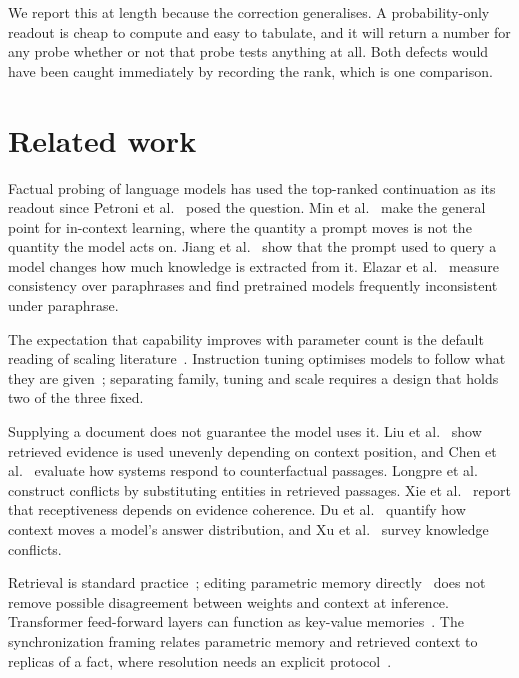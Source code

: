 \documentclass[10pt,conference]{IEEEtran}
\begin{document}
We report this at length because the correction generalises. A probability-only readout is cheap to compute and easy to tabulate, and it will return a number for any probe whether or not that probe tests anything at all. Both defects would have been caught immediately by recording the rank, which is one comparison.

\section{Related work}
Factual probing of language models has used the top-ranked continuation as its readout since Petroni et al.~\cite{petroni2019lama} posed the question. Min et al.~\cite{min2022rethinking} make the general point for in-context learning, where the quantity a prompt moves is not the quantity the model acts on. Jiang et al.~\cite{jiang2020know} show that the prompt used to query a model changes how much knowledge is extracted from it. Elazar et al.~\cite{elazar2021consistency} measure consistency over paraphrases and find pretrained models frequently inconsistent under paraphrase.

The expectation that capability improves with parameter count is the default reading of scaling literature~\cite{kaplan2020scaling,hoffmann2022chinchilla}. Instruction tuning optimises models to follow what they are given~\cite{ouyang2022instructgpt,wei2022flan}; separating family, tuning and scale requires a design that holds two of the three fixed.

Supplying a document does not guarantee the model uses it. Liu et al.~\cite{liu2024lost} show retrieved evidence is used unevenly depending on context position, and Chen et al.~\cite{chen2024benchmarking} evaluate how systems respond to counterfactual passages. Longpre et al.~\cite{longpre2021entity} construct conflicts by substituting entities in retrieved passages. Xie et al.~\cite{xie2024conflicts} report that receptiveness depends on evidence coherence. Du et al.~\cite{du2024context} quantify how context moves a model's answer distribution, and Xu et al.~\cite{xu2024conflicts} survey knowledge conflicts.

Retrieval is standard practice~\cite{lewis2020rag,guu2020realm,gao2023ragsurvey}; editing parametric memory directly~\cite{meng2022rome,meng2023memit} does not remove possible disagreement between weights and context at inference. Transformer feed-forward layers can function as key-value memories~\cite{geva2021kv}. The synchronization framing relates parametric memory and retrieved context to replicas of a fact, where resolution needs an explicit protocol~\cite{thakur2022clock}.
\end{document}
